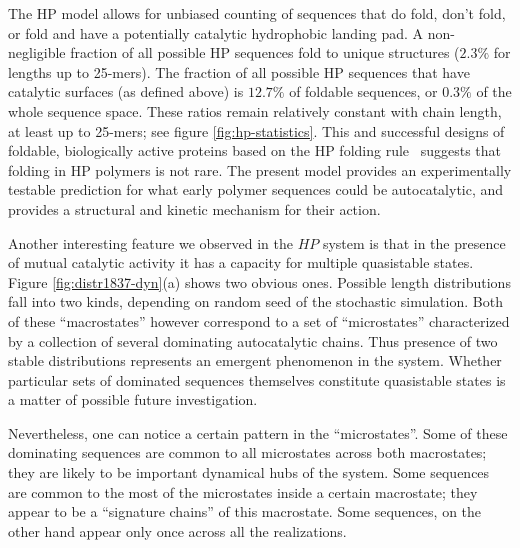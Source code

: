 \documentclass[5p,times]{elsarticle}
\begin{document}
 The HP model allows for unbiased counting of sequences that do fold, don't fold, or fold and have 
a potentially catalytic hydrophobic landing pad.  A non-negligible fraction of all possible HP 
sequences fold to unique structures ($2.3\% $ for lengths up to 25-mers). The fraction of all 
possible HP sequences that have catalytic surfaces (as defined above) is $12.7\%$ of foldable 
sequences, or $0.3\%$ of the whole sequence space.  These ratios remain relatively constant with 
chain length, at least up to 25-mers; see figure \ref{fig:hp-statistics}.  This and successful 
designs of foldable, biologically active proteins based on the HP folding rule~\cite{Murphy2015} 
suggests that folding in HP polymers is not rare.  
   The present model provides an experimentally testable prediction for what early 
  polymer sequences could be autocatalytic, and provides a structural and kinetic mechanism for 
their action. 

Another interesting 
feature we observed in the $HP$ system is that in the presence of mutual catalytic activity it has 
a capacity for 
multiple quasistable states. Figure \ref{fig:distr1837-dyn}(a) shows two obvious ones.
Possible 
length distributions fall into two kinds, depending on random seed of the stochastic simulation. 
Both of these ``macrostates'' however correspond to a set of ``microstates'' characterized by a 
collection of several dominating autocatalytic chains. Thus presence of two stable distributions 
represents an emergent phenomenon in the system.
Whether particular sets of dominated sequences themselves constitute quasistable states is a matter 
of possible future investigation.

Nevertheless, one can notice a certain pattern in the ``microstates''.
Some of these dominating sequences are common to 
all microstates across both macrostates; they are likely to be important dynamical hubs of the 
system. Some sequences are common to the most of the microstates inside a certain macrostate; they 
appear to be a ``signature chains'' of this macrostate. Some sequences, on the other hand appear 
only once across all the realizations. 
\end{document}

